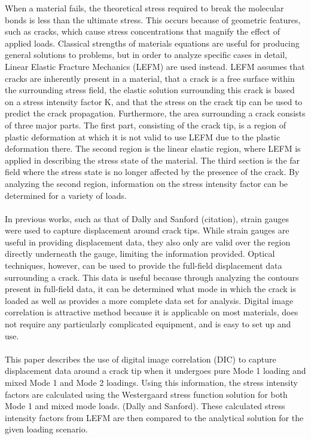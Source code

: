 \documentclass[12pt]{article}
\begin{document}
When a material fails, the theoretical stress required to break the molecular bonds is less than the ultimate stress. This occurs because of geometric features, such as cracks, which cause stress concentrations that magnify the effect of applied loads. Classical strengths of materials equations are useful for producing general solutions to problems, but in order to analyze specific cases in detail, Linear Elastic Fracture Mechanics (LEFM) are used instead. LEFM assumes that cracks are inherently present in a material, that a crack is a free surface within the surrounding stress field, the elastic solution surrounding this crack is based on a stress intensity factor K, and that the stress on the crack tip can be used to predict the crack propagation. Furthermore, the area surrounding a crack consists of three major parts. The first part, consisting of the crack tip, is a region of plastic deformation at which it is not valid to use LEFM due to the plastic deformation there. The second region is the linear elastic region, where LEFM is applied in describing the stress state of the material. The third section is the far field where the stress state is no longer affected by the presence of the crack. By analyzing the second region, information on the stress intensity factor can be determined for a variety of loads.
\\
\\
In previous works, such as that of Dally and Sanford (citation), strain gauges were used to capture displacement around crack tips. While strain gauges are useful in providing displacement data, they also only are valid over the region directly underneath the gauge, limiting the information provided. Optical techniques, however, can be used to provide the full-field displacement data surrounding a crack. This data is useful because through analyzing the contours present in full-field data, it can be determined what mode in which the crack is loaded as well as provides a more complete data set for analysis. Digital image correlation is attractive method because it is applicable on most materials, does not require any particularly complicated equipment, and is easy to set up and use.
\\
\\
This paper describes the use of digital image correlation (DIC) to capture displacement data around a crack tip when it undergoes pure Mode 1 loading and mixed Mode 1 and Mode 2 loadings. Using this information, the stress intensity factors are calculated using the Westergaard stress function solution for both Mode 1 and mixed mode loads. (Dally and Sanford). These calculated stress intensity factors from LEFM are then compared to the analytical solution for the given loading scenario.
\end{document}
